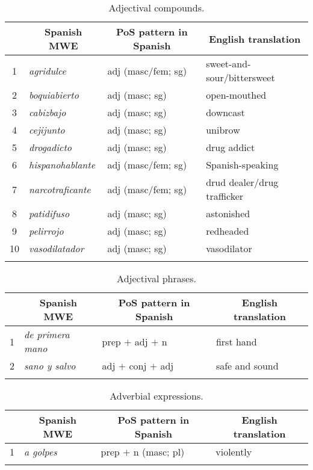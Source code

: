 \documentclass[output=paper]{langsci/langscibook}
\begin{document}
\begin{table}[H]
\centering
\caption{Adjectival compounds.}
\label{tab:adjCompounds-semifixed}
\begin{tabular}{c|lll}
\lsptoprule
\textbf{} & \multicolumn{1}{c}{\textbf{Spanish MWE}} & \multicolumn{1}{c}{\textbf{PoS pattern in Spanish}} & \multicolumn{1}{c}{\textbf{English translation}} \\ %
\midrule
1 & \textit{agridulce} & adj (masc/fem; sg) & sweet-and-sour/bittersweet \\
2 & \textit{boquiabierto} & adj (masc; sg) & open-mouthed \\
3 & \textit{cabizbajo} & adj (masc; sg) & downcast \\
4 & \textit{cejijunto} & adj (masc; sg) & unibrow \\
5 & \textit{drogadicto} & adj (masc; sg) & drug addict \\
6 & \textit{hispanohablante} & adj (masc/fem; sg) & Spanish-speaking \\
7 & \textit{narcotraficante} & adj (masc/fem; sg) & drud dealer/drug trafficker \\
8 & \textit{patidifuso} & adj (masc; sg) & astonished \\
9 & \textit{pelirrojo} & adj (masc; sg) & redheaded \\
10 & \textit{vasodilatador} & adj (masc; sg) & vasodilator\\
\lspbottomrule
\end{tabular}
\end{table}

\begin{table}[H]
\centering
\caption{Adjectival phrases.}
\label{tab:adjPhrases-semifixed}
\begin{tabular}{c|lll}
\lsptoprule
\textbf{} & \multicolumn{1}{c}{\textbf{Spanish MWE}} & \multicolumn{1}{c}{\textbf{PoS pattern in Spanish}} & \multicolumn{1}{c}{\textbf{English translation}} \\%
\midrule
1 & \textit{de primera mano} & prep $+$ adj $+$ n & first hand \\
2 & \textit{sano y salvo} & adj $+$ conj $+$ adj & safe and sound\\
\lspbottomrule
\end{tabular}
\end{table}

\begin{table}[H]
\centering
\caption{Adverbial expressions.}
\label{tab:advExps-semifixed}
\begin{tabular}{c|lll}
\lsptoprule
\textbf{} & \multicolumn{1}{c}{\textbf{Spanish MWE}} & \multicolumn{1}{c}{\textbf{PoS pattern in Spanish}} & \multicolumn{1}{c}{\textbf{English translation}} \\ %
\midrule
1 & \textit{a golpes} & prep $+$ n (masc; pl) & violently\\
\lspbottomrule
\end{tabular}
\end{table}
\end{document}
